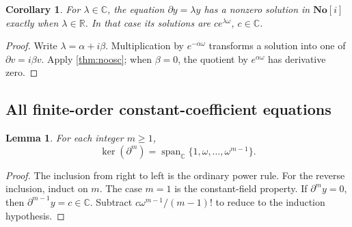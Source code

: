 \documentclass[11pt,a4paper]{article}
\newtheorem{lemma}[theorem]{Lemma}
\newtheorem{corollary}[theorem]{Corollary}
\theoremstyle{definition}
\newcommand{\SC}{\mathbf{No}[i]}
\newcommand{\R}{\mathbb R}
\newcommand{\C}{\mathbb C}
\newcommand{\D}{\partial}
\newcommand{\Span}{\operatorname{span}}
\DeclareMathOperator{\Ker}{ker}
\numberwithin{equation}{section}
\begin{document}
\begin{corollary}\label{cor:constantlambda}
For $\lambda\in\C$, the equation $\D y=\lambda y$ has a nonzero
solution in $\SC$ exactly when $\lambda\in\R$. In that case its
solutions are $c e^{\lambda\omega}$, $c\in\C$.
\end{corollary}
\begin{proof}
Write $\lambda=\alpha+i\beta$. Multiplication by
$e^{-\alpha\omega}$ transforms a solution into one of
$\D v=i\beta v$. Apply \cref{thm:noosc}; when $\beta=0$, the quotient
by $e^{\alpha\omega}$ has derivative zero.
\end{proof}

\subsection{All finite-order constant-coefficient equations}
\begin{lemma}\label{lem:polykernel}
For each integer $m\ge1$,
\[
 \Ker(\D^m)=\Span_\C\{1,\omega,\ldots,\omega^{m-1}\}.
\]
\end{lemma}
\begin{proof}
The inclusion from right to left is the ordinary power rule. For the
reverse inclusion, induct on $m$. The case $m=1$ is the constant-field
property. If $\D^m y=0$, then $\D^{m-1}y=c\in\C$. Subtract
$c\omega^{m-1}/(m-1)!$ to reduce to the induction hypothesis.
\end{proof}
\end{document}
